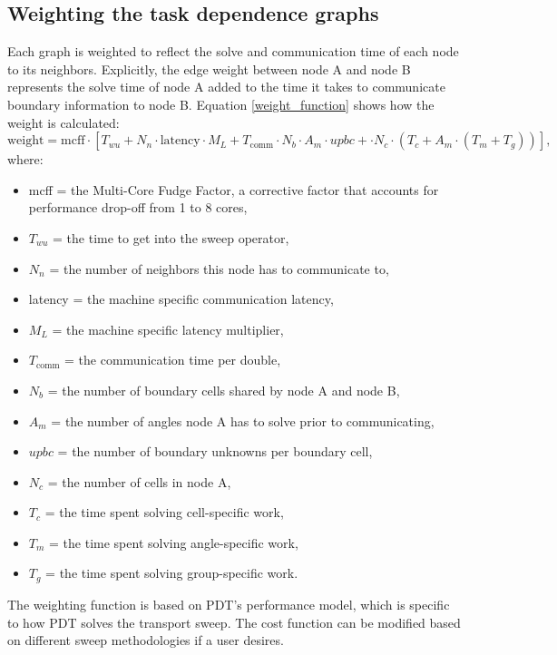 \subsection{Weighting the task dependence graphs}

Each graph is weighted to reflect the solve and communication time of each node to its neighbors. Explicitly, the edge weight between node A and node B represents the solve time of node A added to the time it takes to communicate boundary information to node B. Equation \ref{weight_function} shows how the weight is calculated:
\begin{equation}
\text{weight} = \text{mcff}\cdot [T_{wu} + N_n\cdot \text{latency}\cdot M_L + T_{\text{comm}}\cdot N_b\cdot A_m\cdot upbc + \cdot N_c\cdot (T_c + A_m\cdot (T_m + T_g))],
\label{weight_function}
\end{equation}
where:
\begin{itemize}
  \item mcff = the Multi-Core Fudge Factor, a corrective factor that accounts for performance drop-off from 1 to 8 cores,
  \item $T_{wu}$ = the time to get into the sweep operator,
  \item $N_n$ = the number of neighbors this node has to communicate to,
  \item latency = the machine specific communication latency,
  \item $M_L$ = the machine specific latency multiplier,
  \item $T_{\text{comm}}$ = the communication time per double,
  \item $N_b$ = the number of boundary cells shared by node A and node B,
  \item $A_m$ = the number of angles node A has to solve prior to communicating,
  \item $upbc$ = the number of boundary unknowns per boundary cell,
  \item $N_c$ = the number of cells in node A,
  \item $T_c$ = the time spent solving cell-specific work,
  \item $T_m$ = the time spent solving angle-specific work,
  \item $T_g$ = the time spent solving group-specific work.
\end{itemize}
The weighting function is based on PDT's performance model\cite{mpadams15}, which is specific to how PDT solves the transport sweep. The cost function can be modified based on different sweep methodologies if a user desires.

